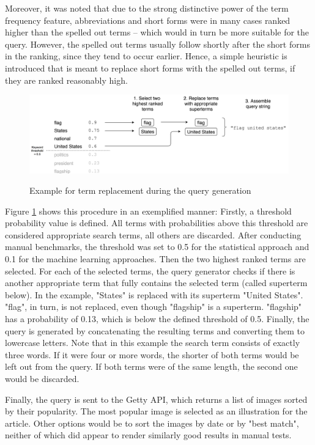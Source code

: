 \documentclass[11pt,a4paper,twoside]{article}
\begin{document}
Moreover, it was noted that due to the strong distinctive power of the term frequency feature, abbreviations and short forms were in many cases ranked higher than the spelled out terms -- which would in turn be more suitable for the query. However, the spelled out terms usually follow shortly after the short forms in the ranking, since they tend to occur earlier. Hence, a simple heuristic is introduced that is meant to replace short forms with the spelled out terms, if they are ranked reasonably high.

\begin{figure}[h]
    \caption{Example for term replacement during the query generation}
    \centering
    \includegraphics[width=\columnwidth]{picpic-querygen.png}
    \label{fig:example-querygen}
\end{figure}

Figure \ref{fig:example-querygen} shows this procedure in an exemplified manner: Firstly, a threshold probability value is defined. All terms with probabilities above this threshold are considered appropriate search terms, all others are discarded. After conducting manual benchmarks, the threshold was set to 0.5 for the statistical approach and 0.1 for the machine learning approaches. Then the two highest ranked terms are selected. For each of the selected terms, the query generator checks if there is another appropriate term that fully contains the selected term (called superterm below). In the example, "States" is replaced with its superterm "United States". "flag", in turn, is not replaced, even though "flagship" is a superterm. "flagship" has a probability of 0.13, which is below the defined threshold of 0.5. Finally, the query is generated by concatenating the resulting terms and converting them to lowercase letters. Note that in this example the search term consists of exactly three words. If it were four or more words, the shorter of both terms would be left out from the query. If both terms were of the same length, the second one would be discarded.

Finally, the query is sent to the Getty API, which returns a list of images sorted by their popularity. The most popular image is selected as an illustration for the article. Other options would be to sort the images by date or by "best match", neither of which did appear to render similarly good results in manual tests.
\end{document}
